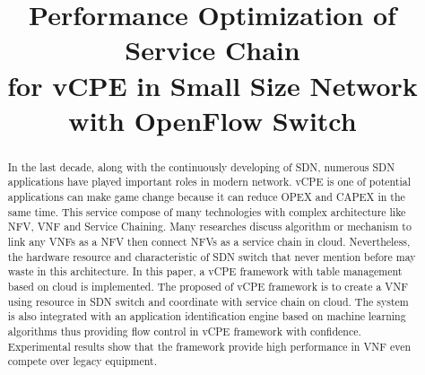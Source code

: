 \documentclass[journal]{IEEEtran}
\begin{document}
\title{Performance Optimization of Service Chain \\ for vCPE in Small Size Network \\ with OpenFlow Switch}

\author{

}


\maketitle

\begin{abstract}
In the last decade, along with the continuously developing of SDN, numerous SDN applications have played important roles in modern network. vCPE is one of potential applications can make game change because it can reduce OPEX and CAPEX in the same time. This service compose of many technologies with complex architecture like NFV, VNF and Service Chaining. Many researches discuss algorithm or mechanism to link any VNFs as a NFV then connect NFVs as a service chain in cloud. Nevertheless, the hardware resource and characteristic of SDN switch that never mention before may waste in this architecture. In this paper, a vCPE framework with table management based on cloud is implemented. The proposed of vCPE framework is to create a VNF using resource in SDN switch and coordinate with service chain on cloud. The system is also integrated with an application identification engine based on machine learning algorithms thus providing flow control in vCPE framework with confidence. Experimental results show that the framework provide high performance in VNF even compete over legacy equipment.
\end{abstract}
\end{document}
